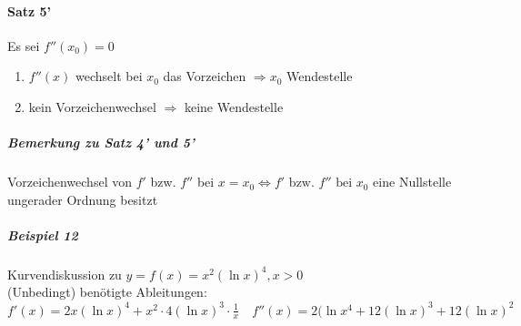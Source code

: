 \documentclass[a4paper]{scrartcl}
\begin{document}
\paragraph{Satz 5'} Es sei $f''(x_0) = 0$
\begin{enumerate}
\item $f''(x)$ wechselt bei $x_0$ das Vorzeichen $\Rightarrow x_0$ Wendestelle
\item kein Vorzeichenwechsel $\Rightarrow$ keine Wendestelle
\end{enumerate}

\subparagraph{Bemerkung zu Satz 4' und 5'} Vorzeichenwechsel von $f'$ bzw. $f''$ bei $x=x_0 \Leftrightarrow f' \text{ bzw. } f'' \text{ bei } x_0$ eine Nullstelle ungerader Ordnung besitzt

\subparagraph{Beispiel 12} Kurvendiskussion zu $y=f(x) = x^2 ( \ln{x})^4, x > 0$\\
(Unbedingt) benötigte Ableitungen: $f'(x) = 2x (\ln{x})^4 + x^2 \cdot 4 ( \ln{x})^3 \cdot \frac{1}{x} \quad f''(x) = 2(\ln{x}^4 + 12(\ln{x})^3 + 12(\ln{x})^2$
\end{document}
